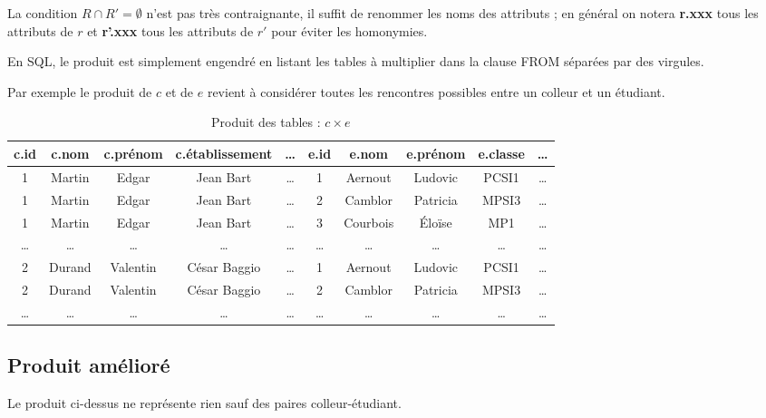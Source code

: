 La condition $R\cap R'=\emptyset$ n'est pas très contraignante, il suffit de renommer les noms des attributs ; en général on notera {\bf r.xxx} tous les attributs de $r$ et {\bf r'.xxx} tous les attributs de $r'$ pour éviter les homonymies.

En SQL, le produit est simplement engendré en listant les tables à multiplier dans la clause {\sc FROM} séparées par des virgules.

Par exemple le produit de $c$  et de $e$ revient à considérer toutes les rencontres possibles entre un colleur et un étudiant.
\begin{table}[ht]
\caption{Produit des tables : $c\times e$}
\begin{center}
\begin{tabular}{|c|c|c|c|c|c|c|c|c|c|}
\hline
{\bf c.id} &{\bf c.nom} & {\bf c.prénom}&{\bf c.établissement} & \dots&{\bf e.id} &{\bf e.nom} & {\bf e.prénom}&{\bf e.classe} & \dots\\
  \hline
1&Martin&Edgar&Jean Bart&\dots&1&Aernout&Ludovic&PCSI1&\dots\\
1&Martin&Edgar&Jean Bart&\dots&2&Camblor&Patricia&MPSI3&\dots\\
1&Martin&Edgar&Jean Bart&\dots&3&Courbois&Éloïse&MP1&\dots\\
\dots&\dots&\dots&\dots&\dots&\dots&\dots&\dots&\dots&\dots\\
2&Durand&Valentin&César Baggio&\dots&1&Aernout&Ludovic&PCSI1&\dots\\
2&Durand&Valentin&César Baggio&\dots&2&Camblor&Patricia&MPSI3&\dots\\
\dots&\dots&\dots&\dots&\dots&\dots&\dots&\dots&\dots&\dots\\
\end{tabular}
\end{center}
\end{table}
\subsection{Produit amélioré}
Le produit ci-dessus ne représente rien sauf des paires colleur-étudiant.


